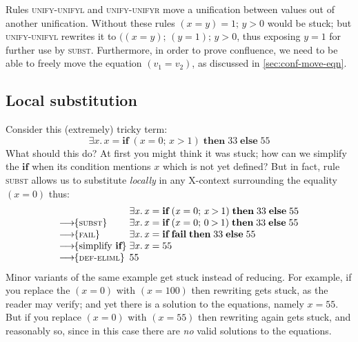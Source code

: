 \documentclass[acmsmall,review,dvipsnames]{acmart}
\newcommand{\Varid}[1]{\mathit{#1}}
\newcommand{\rulename}[1]{\textsc{\small #1}}
\newcommand{\movesto}{\longrightarrow}
\newcommand{\movestoC}[1]{\movesto\!\!\{#1\}}
\newcommand{\movestoR}[1]{\movestoC{\rulename{#1}}}
\begin{document}
Rules \rulename{unify-unifyl} and \rulename{unify-unifyr} move a unification between values out of another unification.
Without these rules \ensuremath{(\Varid{x}\mathrel{=}\Varid{y})\mathrel{=}\mathrm{1};\,\Varid{y}\mathbin{>}\mathrm{0}} would be stuck; but \rulename{unify-unifyl}
rewrites it to \ensuremath{((\Varid{x}\mathrel{=}\Varid{y});\,(\Varid{y}\mathrel{=}\mathrm{1});\,\Varid{y}\mathbin{>}\mathrm{0}}, thus exposing \ensuremath{\Varid{y}\mathrel{=}\mathrm{1}} for further use by \rulename{subst}. Furthermore, in order
to prove confluence, we need to be able to freely move the equation \ensuremath{(\Varid{v}_{\mathrm{1}}\mathrel{=}\Varid{v}_{\mathrm{2}})},
as discussed in \cref{sec:conf-move-eqn}.

\subsection{Local substitution} \label{sec:local-subst}

Consider this (extremely) tricky term:
$$
\ensuremath{\exists\Varid{x}.\,\Varid{x}\mathrel{=}\textbf{if}\;(\Varid{x}\mathrel{=}\mathrm{0};\,\Varid{x}\mathbin{>}\mathrm{1})\;\textbf{then}\;\mathrm{33}\;\textbf{else}\;\mathrm{55}}
$$
What should this do? At first you might think it was stuck; how can we simplify the \ensuremath{\textbf{if}}
when its condition mentions \ensuremath{\Varid{x}} which is not yet defined?  But in fact, rule \rulename{subst} allows
us to substitute \emph{locally} in any X-context surrounding the equality \ensuremath{(\Varid{x}\mathrel{=}\mathrm{0})} thus:
$$
\begin{array}{l@{\;}l}
                                & \ensuremath{\exists\Varid{x}.\,\Varid{x}\mathrel{=}\textbf{if}\;(\Varid{x}\mathrel{=}\mathrm{0};\,\Varid{x}\mathbin{>}\mathrm{1})\;\textbf{then}\;\mathrm{33}\;\textbf{else}\;\mathrm{55}} \\
\movestoR{subst}                & \ensuremath{\exists\Varid{x}.\,\Varid{x}\mathrel{=}\textbf{if}\;(\Varid{x}\mathrel{=}\mathrm{0};\,\mathrm{0}\mathbin{>}\mathrm{1})\;\textbf{then}\;\mathrm{33}\;\textbf{else}\;\mathrm{55}} \\
\movestoR{fail}                 & \ensuremath{\exists\Varid{x}.\,\Varid{x}\mathrel{=}\textbf{if}\;\textbf{fail}\;\textbf{then}\;\mathrm{33}\;\textbf{else}\;\mathrm{55}}\\
\movestoC{\text{simplify \ensuremath{\textbf{if}}}} & \ensuremath{\exists\Varid{x}.\,\Varid{x}\mathrel{=}\mathrm{55}} \\
\movestoR{def-eliml}            & \ensuremath{\mathrm{55}}
\end{array}
$$
Minor variants of the same example get stuck instead of reducing. For example, if you replace
the \ensuremath{(\Varid{x}\mathrel{=}\mathrm{0})} with \ensuremath{(\Varid{x}\mathrel{=}\mathrm{100})} then rewriting gets stuck, as the reader may verify; and yet there
is a solution to the equations, namely $x=55$.
But if you replace \ensuremath{(\Varid{x}\mathrel{=}\mathrm{0})} with \ensuremath{(\Varid{x}\mathrel{=}\mathrm{55})} then rewriting again
gets stuck, and reasonably so, since in this case there are \emph{no} valid solutions to the equations.
\end{document}
